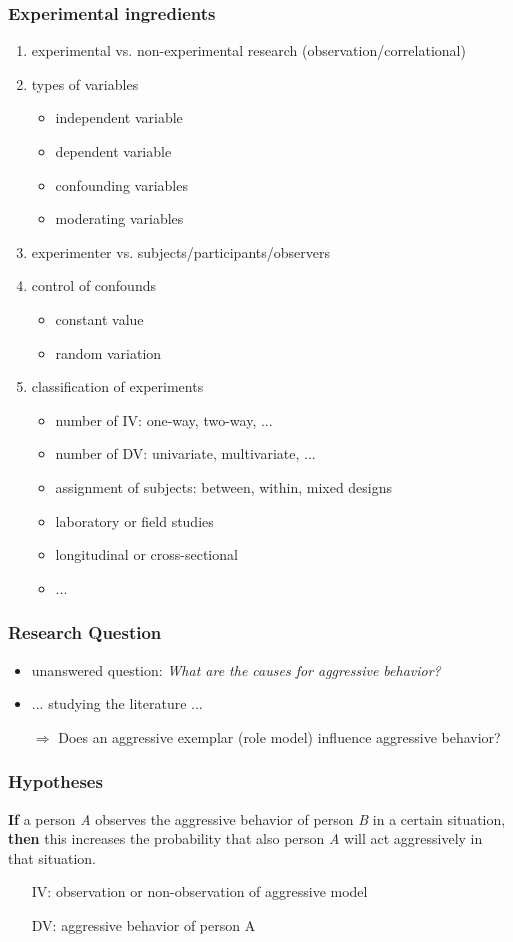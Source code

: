 \documentclass[]{beamer}
\begin{document}
\begin{frame}
 \frametitle{Experimental ingredients}
\begin{enumerate}[<+->]
 \item experimental vs. non-experimental research (observation/correlational)
 \item types of variables
 \begin{itemize}
  \item independent variable
  \item dependent variable
  \item confounding variables
  \item moderating variables
 \end{itemize}
 \item experimenter vs. subjects/participants/observers
 \item control of confounds
  \begin{itemize}
   \item constant value
   \item random variation
  \end{itemize}
 \item classification of experiments
  \begin{itemize}
   \item number of IV: one-way, two-way, ...
   \item number of DV: univariate, multivariate, ...
   \item assignment of subjects: between, within, mixed designs 
   \item laboratory or field studies 
   \item longitudinal or cross-sectional
   \item ... 
  \end{itemize}
\end{enumerate}
\end{frame}


\begin{frame}
\frametitle{Research Question}
\begin{itemize}
 \item unanswered question: \textit{What are the causes for aggressive
behavior?}
 \item ... studying the literature ...
 \item[$\Rightarrow$] Does an aggressive exemplar (role model) influence
aggressive behavior? 
\end{itemize}
\end{frame}

\begin{frame}
\frametitle{Hypotheses}
\textbf{If} a person \textit{A} observes the aggressive behavior
of person \textit{B} in a certain situation, \textbf{then} this increases the
probability that also person \textit{A} will act aggressively in that
situation.
\begin{itemize}
 \item[IV:] observation or non-observation of aggressive model
 \item[DV:] aggressive behavior of person A
\end{itemize}
\end{frame}
\end{document}
